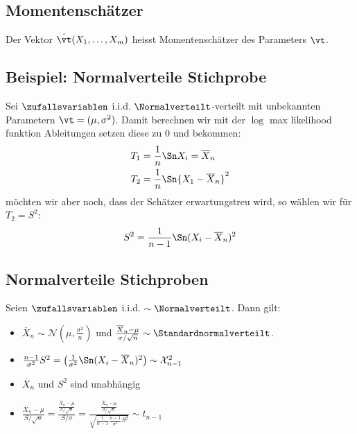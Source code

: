 \subsection*{Momentenschätzer}
Der Vektor $\hat{\vt} (X_1, \dots, X_m)$ heisst Momentenschätzer des Parameters
$\vt$.
\subsection*{Beispiel: Normalverteile Stichprobe}
Sei $\zufallsvariablen$ i.i.d. $\Normalverteilt$-verteilt mit unbekannten
Parametern $\vt = (\mu, \sigma^2)$. Damit berechnen wir mit der $\log$ max
likelihood funktion Ableitungen setzen diese zu $0$ und bekommen:
\begin{align*}
  T_1 & = \frac{1}{n} \Sn X_i = \overline{X}_n     \\
  T_2 & = \frac{1}{n} \Sn {X_1 - \overline{X}_n}^2
\end{align*}
möchten wir aber noch, dass der Schätzer erwartungstreu wird,
so wählen wir für $T_2 = S^2$:
\begin{align*}
  S^2 = \frac{1}{n-1} \Sn  (X_i - \overline{X}_n)^2
\end{align*}
\subsection*{Normalverteile Stichproben}
Seien $\zufallsvariablen$ i.i.d. $\sim \Normalverteilt$. Dann gilt:
\begin{itemize}
  \item $\overline{X}_n \sim \mathcal{N} (\mu, \frac{\sigma^2}{n})$
        und $\frac{\overline{X}_n - \mu}{\sigma / \sqrt{n}} \sim \Standardnormalverteilt$.
  \item $\frac{n-1}{\sigma^2} S^2 = \left( \frac{1}{\sigma^2} \Sn  (X_i - \overline{X}_n)^2 \right) \sim \mathcal{X}^2_{n-1}$
  \item $\overline{X}_n$ und $S^2$ sind unabhängig
  \item $\frac{\overline{X}_n - \mu}{S / \sqrt{n}} = \frac{ \frac{\overline{X}_n - \mu}{\sigma / \sqrt{n}} }{S / \sigma} = \frac{ \frac{\overline{X}_n - \mu}{\sigma / \sqrt{n}} }{\sqrt{\frac{1}{n-1} \frac{n-1}{\sigma^2} S^2}} \sim t_{n-1}$
\end{itemize}